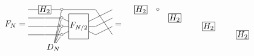 \documentclass[oneside]{book}
\newcommand\sbullet[1][1.5pt]{%
  \tikz[baseline=-0.5ex]\draw (0,0) circle (#1);%
}
\begin{document}
\[
F_N =
\begin{tikzpicture}[baseline=-2em, x=2em, y=1em, inner sep=1pt]
    \node[rectangle,draw] (H) at (0,0) {$H_2$};
    \node[inner sep=0pt, minimum size=0pt] (l1) at (0,-1) {};
    \node[inner sep=0pt, minimum size=0pt] (l2) at (0,-2) {};
    \node[inner sep=0pt, minimum size=0pt] (l3) at (0,-3) {};
    \node[inner sep=0pt, minimum size=0pt] (L0) at (-1,0) {};
    \node[inner sep=0pt, minimum size=0pt] (L1) at (-1,-1) {};
    \node[inner sep=0pt, minimum size=0pt] (L2) at (-1,-2) {};
    \node[inner sep=0pt, minimum size=0pt] (L3) at (-1,-3) {};
    \node[inner sep=0pt, minimum size=0pt] (b0) at (1,0) {$\sbullet$};
    \node[inner sep=0pt, minimum size=0pt] (b1) at (1,-1) {$\sbullet$};
    \node[inner sep=0pt, minimum size=0pt] (b2) at (1,-2) {$\sbullet$};
    \node[inner sep=0pt, minimum size=0pt] (b3) at (1,-3) {$\sbullet$};
    \node (D) at (.5,-4.5) {$D_N$};
    \node[rectangle,draw,minimum height=3em] (F) at (2,-2) {$F_{N/2}$};
    \node[inner sep=0pt, minimum size=0pt] (r0) at (4,0) {};
    \node[inner sep=0pt, minimum size=0pt] (r1) at (4,-1) {};
    \node[inner sep=0pt, minimum size=0pt] (r2) at (4,-2) {};
    \node[inner sep=0pt, minimum size=0pt] (r3) at (4,-3) {};
    \node[inner sep=0pt, minimum size=0pt] (s0) at (3,0) {};
    \node[inner sep=0pt, minimum size=0pt] (s1) at (3,-1) {};
    \node[inner sep=0pt, minimum size=0pt] (s2) at (3,-2) {};
    \node[inner sep=0pt, minimum size=0pt] (s3) at (3,-3) {};
    \draw (b0) -- (D);
    \draw (b1) -- (D);
    \draw (b2) -- (D);
    \draw (b3) -- (D);
    \draw (L0) -- (H) -- (b0) -- (s0) -- (r3);
    \draw (L1) -- (l1) -- (b1) -- (F) -- (s1) -- (r0);
    \draw (L2) -- (l2) -- (b2) -- (F) -- (s2) -- (r1);
    \draw (L3) -- (l3) -- (b3) -- (F) -- (s3) -- (r2);
\end{tikzpicture}
=
\begin{tikzpicture}[baseline=-2em, x=2em, y=1em, inner sep=1pt]
    \node[rectangle,draw] (H) at (0,0) {$H_2$};
    \node[rectangle,draw] (H2) at (2,-1) {$H_2$};
    \node[rectangle,draw] (H3) at (4,-2) {$H_2$};
    \node[rectangle,draw] (H4) at (6,-3) {$H_2$};
    \node[inner sep=0pt, minimum size=0pt] (l1) at (0,-1) {};
    \node[inner sep=0pt, minimum size=0pt] (l2) at (0,-2) {};
    \node[inner sep=0pt, minimum size=0pt] (l3) at (0,-3) {};
    \node[inner sep=0pt, minimum size=0pt] (L0) at (-1,0) {};
    \node[inner sep=0pt, minimum size=0pt] (L1) at (-1,-1) {};
    \node[inner sep=0pt, minimum size=0pt] (L2) at (-1,-2) {};
    \node[inner sep=0pt, minimum size=0pt] (L3) at (-1,-3) {};
    \node[inner sep=0pt, minimum size=0pt] (b0) at (1,0) {$\sbullet$};

\end{tikzpicture}\]
\end{document}

